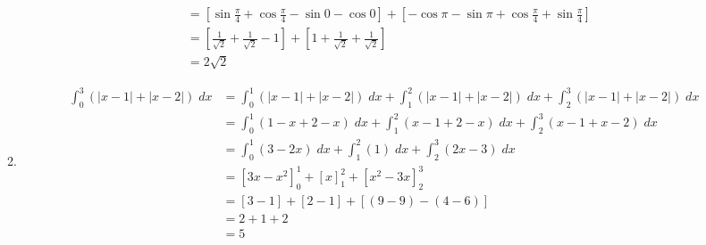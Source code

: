 \begin{enumerate}
\begin{solution}
\begin{enumerate}
\begin{align*}
                        &= \left[\sin \frac{\pi}{4} + \cos \frac{\pi}{4} - \sin 0 - \cos 0\right] + \left[-\cos \pi - \sin \pi + \cos \frac{\pi}{4} + \sin \frac{\pi}{4}\right]\\
                        &= \left[\frac{1}{\sqrt{2}} + \frac{1}{\sqrt{2}} - 1 \right] + \left[1 + \frac{1}{\sqrt{2}} + \frac{1}{\sqrt{2}}\right]\\
                        &= 2\sqrt{2}
                    \end{align*}
\BgThispage
                \item
                    \begin{align*}
                        \int_0^3 (|x - 1| + |x - 2|) \; dx &= \int_0^1 (|x - 1| + |x - 2|) \; dx + \int_1^2 (|x - 1| + |x - 2|) \; dx + \int_2^3 (|x - 1| + |x - 2|) \; dx\\
                        &= \int_0^1 (1 - x + 2 - x) \; dx + \int_1^2 (x - 1 + 2 - x) \; dx + \int_2^3 (x - 1 + x - 2) \; dx\\
                        &= \int_0^1 (3 - 2x) \; dx + \int_1^2 (1) \; dx + \int_2^3 (2x - 3) \; dx\\
                        &= \left[3x - x^2\right]_0^1 + \left[x\right]_1^2 + \left[x^2 - 3x\right]_2^3\\
                        &= \left[3 - 1\right] + \left[2 - 1\right] + \left[(9 - 9) -(4-6)\right]\\
                        &= 2 + 1 + 2\\
                        &= 5
                    \end{align*}


\end{enumerate}
\end{solution}
\end{enumerate}
